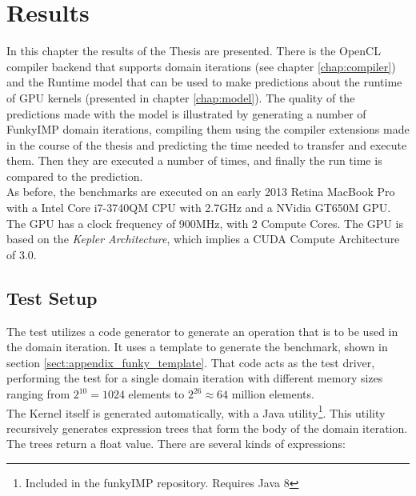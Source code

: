


\chapter{Results}
\label{chap:results}
In this chapter the results of the Thesis are presented. There is the OpenCL compiler backend that supports domain iterations (see chapter \ref{chap:compiler}) and the Runtime model that can be used to make predictions about the runtime of GPU kernels (presented in chapter \ref{chap:model}). The quality of the predictions made with the model is illustrated by generating a number of FunkyIMP domain iterations, compiling them using the compiler extensions made in the course of the thesis and predicting the time needed to transfer and execute them. Then they are executed a number of times, and finally the run time is compared to the prediction. \\

As before, the benchmarks are executed on an early 2013 Retina MacBook Pro with a Intel Core i7-3740QM CPU with 2.7GHz and a NVidia GT650M GPU. The GPU has a clock frequency of 900MHz, with 2 Compute Cores. The GPU is based on the \textit{Kepler Architecture}, which implies a CUDA Compute Architecture of 3.0. \cite{nvidia2009opencl} \\


\section{Test Setup}
\label{sect:results_setup}

The test utilizes a code generator to generate an operation that is to be used in the domain iteration. It uses a template to generate the benchmark, shown in section \ref{sect:appendix_funky_template}. That code acts as the test driver, performing the test for a single domain iteration with different memory sizes ranging from $2^{10} = 1024 $ elements to $2^{26} \approx 64$ million elements. \\

The Kernel itself is generated automatically, with a Java utility\footnote{Included in the funkyIMP repository. Requires Java 8}. This utility recursively generates expression trees that form the body of the domain iteration. The trees return a float value. There are several kinds of expressions:

